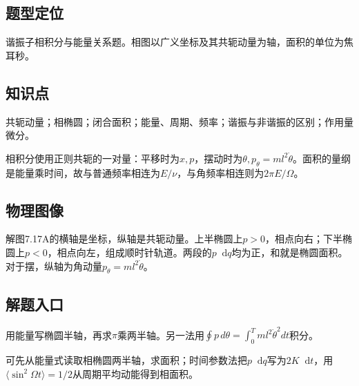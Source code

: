 \documentclass[UTF8,fontset=fandol,a4paper,11pt]{ctexart}
\newcommand{\dd}{\mathop{}\!\mathrm{d}}
\begin{document}


\subsection*{题型定位}

谐振子相积分与能量关系题。相图以广义坐标及其共轭动量为轴，面积的单位为焦耳秒。



\subsection*{知识点}

共轭动量；相椭圆；闭合面积；能量、周期、频率；谐振与非谐振的区别；作用量微分。

相积分使用正则共轭的一对量：平移时为$x,p$，摆动时为$\theta,p_\theta=ml^2\dot\theta$。面积的量纲是能量乘时间，故与普通频率相连为$E/\nu$，与角频率相连则为$2\pi E/\Omega$。




\subsection*{物理图像}

解图7.17A的横轴是坐标，纵轴是共轭动量。上半椭圆上$p>0$，相点向右；下半椭圆上$p<0$，相点向左，组成顺时针轨道。两段的$p\dd q$均为正，和就是椭圆面积。对于摆，纵轴为角动量$p_\theta=ml^2\dot\theta$。




\subsection*{解题入口}

用能量写椭圆半轴，再求\(\pi\)乘两半轴。另一法用\(\oint p\,d\theta=\int_0^T ml^2\dot\theta^2dt\)积分。

可先从能量式读取相椭圆两半轴，求面积；时间参数法把$p\dd q$写为$2K\dd t$，用$\langle\sin^2\Omega t\rangle=1/2$从周期平均动能得到相面积。



\end{document}
